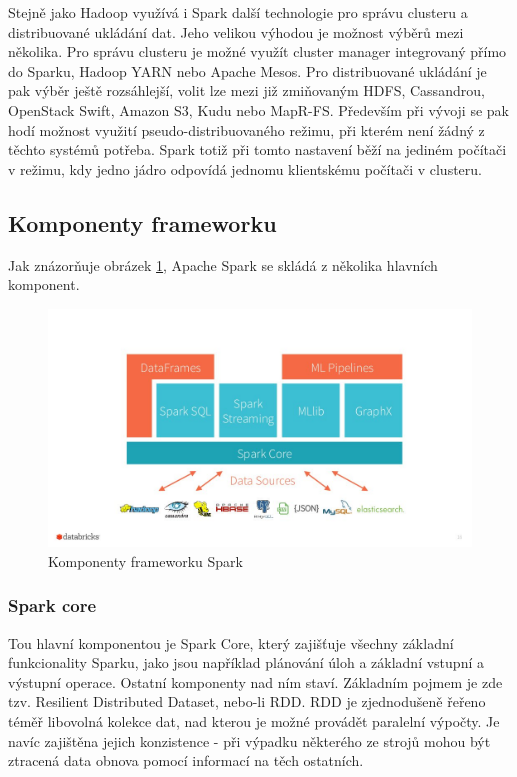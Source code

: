 \documentclass[thesis=B,czech]{FITthesis}[2012/06/26]
\begin{document}
	Stejně jako Hadoop využívá i Spark další technologie pro správu clusteru a distribuované ukládání dat. Jeho velikou výhodou je možnost výběrů mezi několika. Pro správu clusteru je možné využít cluster manager integrovaný přímo do Sparku, Hadoop YARN nebo Apache Mesos. Pro distribuované ukládání je pak výběr ještě rozsáhlejší, volit lze mezi již zmiňovaným HDFS, Cassandrou, OpenStack Swift, Amazon S3, Kudu nebo MapR-FS. Především při vývoji se pak hodí možnost využití pseudo-distribuovaného režimu, při kterém není žádný z těchto systémů potřeba. Spark totiž při tomto nastavení běží na jediném počítači v režimu, kdy jedno jádro odpovídá jednomu klientskému počítači v clusteru. 

\subsection{Komponenty frameworku}
	Jak znázorňuje obrázek \ref{fig:spark_components}, Apache Spark se skládá z několika hlavních komponent. 
	\begin{figure}[ht]
    	\centering
    	\includegraphics[width=1\textwidth]{images/spark_engine.jpg}
    	\caption{Komponenty frameworku Spark\cite{spark-components}}
    	\label{fig:spark_components}
	\end{figure}
	
\subsubsection{Spark core}
	Tou hlavní komponentou je Spark Core, který zajišťuje všechny základní funkcionality Sparku, jako jsou například plánování úloh a základní vstupní a výstupní operace. Ostatní komponenty nad ním staví. Základním pojmem je zde tzv. Resilient Distributed Dataset, nebo-li RDD. RDD je zjednodušeně řeřeno téměř libovolná kolekce dat, nad kterou je možné provádět paralelní výpočty. Je navíc zajištěna jejich konzistence - při výpadku některého ze strojů mohou být ztracená data obnova pomocí informací na těch ostatních. 
	
\end{document}
